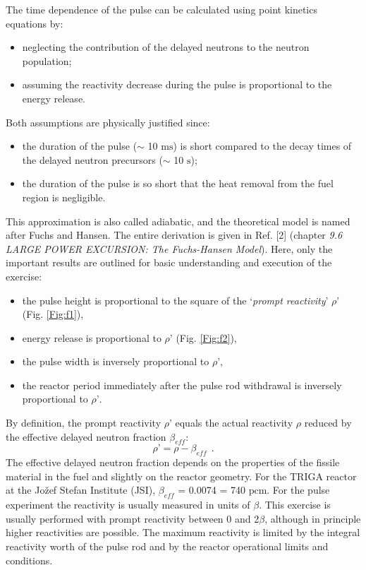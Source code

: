 \documentclass[a4paper,12pt]{article}
\begin{document}
The time dependence of the pulse can be calculated using point kinetics equations by:
\begin{itemize}[noitemsep]
	\item neglecting the contribution of the delayed neutrons to the neutron population;
	\item assuming the reactivity decrease during the pulse is proportional to the energy release.
\end{itemize}

Both assumptions are physically justified since:
\begin{itemize}[noitemsep]
	\item the duration of the pulse ($\sim$ 10 $\mathrm{ms}$) is short compared to the decay times of the delayed neutron precursors ($\sim$ 10 $\mathrm{s}$);
	\item the duration of the pulse is so short that the heat removal from the fuel region is negligible.
\end{itemize}
This approximation is also called adiabatic, and the theoretical model is named after Fuchs and Hansen. The entire derivation is given in Ref. [2] (chapter \textit{9.6 LARGE POWER EXCURSION: The Fuchs-Hansen Model}). Here, only the important results are outlined for basic understanding and execution of the exercise:
\begin{itemize}[noitemsep]
	\item the pulse height is proportional to the square of the ‘\textit{prompt reactivity}’ $\rho’$ (Fig. \ref{Fig:f1}), 
	\item energy release is proportional to $\rho’$ (Fig. \ref{Fig:f2}), 
	\item the pulse width is inversely proportional to $\rho’$, 
	\item the reactor period immediately after the pulse rod withdrawal is inversely proportional to $\rho’$.
\end{itemize}
By definition, the prompt reactivity $\rho’$ equals the actual reactivity $\rho$ reduced by the effective delayed neutron fraction $\beta_{eff}$:
\begin{equation}
\rho’ = \rho - \beta_{eff}~~.
\end{equation}
\noindent The effective delayed neutron fraction depends on the properties of the fissile material in the fuel and slightly on the reactor geometry. For the TRIGA reactor at the Jožef Stefan Institute (JSI), $\beta_{eff}$ = 0.0074 = 740 $\mathrm{pcm}$. For the pulse experiment the reactivity is usually measured in units of $\beta$. This exercise is usually performed with prompt reactivity between 0 and 2$\beta$, although in principle higher reactivities are possible. The maximum reactivity is limited by the integral reactivity worth of the pulse rod and by the reactor operational limits and conditions.
\end{document}
